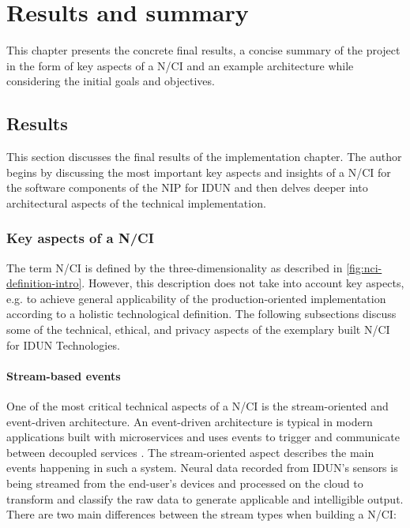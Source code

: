 \chapter{Results and summary}
\graphicspath{{Chapter5/Figs/}{Chapter5/Figs/}}

This chapter presents the concrete final results, a concise summary of the project in the form of key aspects of a N/CI and an example architecture while considering the initial goals and objectives.

\section{Results}
\label{chapter5-results}

This section discusses the final results of the implementation chapter. The author begins by discussing the most important key aspects and insights of a N/CI for the software components of the NIP for IDUN and then delves deeper into architectural aspects of the technical implementation.

\subsection{Key aspects of a N/CI}
\label{chapter5-key-aspects}

The term N/CI is defined by the three-dimensionality as described in \autoref{fig:nci-definition-intro}. However, this description does not take into account key aspects, e.g. to achieve general applicability of the production-oriented implementation according to a holistic technological definition. The following subsections discuss some of the technical, ethical, and privacy aspects of the exemplary built N/CI for IDUN Technologies.

\subsubsection{Stream-based events}
\label{chapter5-stream-based-events}

One of the most critical technical aspects of a N/CI is the stream-oriented and event-driven architecture. An event-driven architecture is typical in modern applications built with microservices and uses events to trigger and communicate between decoupled services \citep{amazon_web_services_inc_event-driven_nodate}. The stream-oriented aspect describes the main events happening in such a system. Neural data recorded from IDUN's sensors is being streamed from the end-user's devices and processed on the cloud to transform and classify the raw data to generate applicable and intelligible output. There are two main differences between the stream types when building a N/CI:

